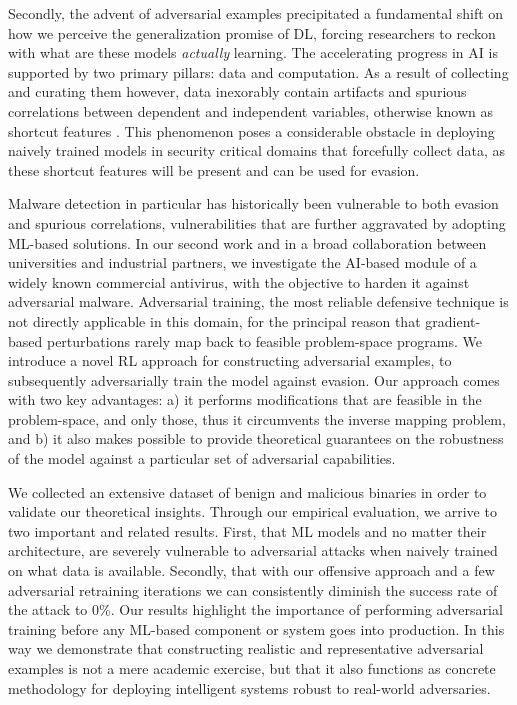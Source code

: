 Secondly, the advent of adversarial examples precipitated a fundamental shift on how we perceive the generalization promise of \gls{DL}, forcing researchers to reckon with what are these models \textit{actually} learning.
The accelerating progress in \gls{AI} is supported by two primary pillars: data and computation.
As a result of collecting and curating them however, data inexorably contain artifacts and spurious correlations between dependent and independent variables, otherwise known as shortcut features \cite{geirhos2020shortcut}.
This phenomenon poses a considerable obstacle in deploying naively trained models in security critical domains that forcefully collect data, as these shortcut features will be present and can be used for evasion.

Malware detection in particular has historically been vulnerable to both evasion and spurious correlations, vulnerabilities that are further aggravated by adopting ML-based solutions.
In our second work and in a broad collaboration between universities and industrial partners, we investigate the \gls{AI}-based module of a widely known commercial antivirus, with the objective to harden it against adversarial malware.
Adversarial training, the most reliable defensive technique is not directly applicable in this domain, for the principal reason that gradient-based perturbations rarely map back to feasible problem-space programs. 
We introduce a novel \gls{RL} approach for constructing adversarial examples, to subsequently adversarially train the model against evasion.
Our approach comes with two key advantages: a) it performs modifications that are feasible in the problem-space, and only those, thus it circumvents the inverse mapping problem, and b) it also makes possible to provide theoretical guarantees on the robustness of the model against a particular set of adversarial capabilities.

We collected an extensive dataset of benign and malicious binaries in order to validate our theoretical insights.
Through our empirical evaluation, we arrive to two important and related results.
First, that \gls{ML} models and no matter their architecture, are severely vulnerable to adversarial attacks when naively trained on what data is available.
Secondly, that with our offensive approach and a few adversarial retraining iterations we can consistently diminish the success rate of the attack to 0\%.
Our results highlight the importance of performing adversarial training before any ML-based component or system goes into production.
In this way we demonstrate that constructing realistic and representative adversarial examples is not a mere academic exercise, but that it also functions as concrete methodology for deploying intelligent systems robust to real-world adversaries.

